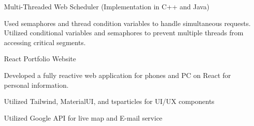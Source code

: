 \begin{cventries}
  \cventry
    {} %
    {Multi-Threaded Web Scheduler (Implementation in C++ and Java)} %
    {} %
    {} %
    {
    \vspace{-5ex}
      \begin{cvitems} %
        \item { Used semaphores and thread condition variables to handle simultaneous requests. Utilized conditional variables and semaphores to prevent multiple threads from accessing critical segments.}
      \end{cvitems}
    }
 
 
   \cventry
    {} %
    {React Portfolio Website} %
    {} %
    {} %
    {
    \vspace{-4ex}
      \begin{cvitems} %
        \item { Developed a fully reactive web application for phones and PC on React for personal information.}
        \item { Utilized Tailwind, MaterialUI, and tsparticles for UI/UX components }
        \item { Utilized Google API for live map and E-mail service }
      \end{cvitems}
    }
     \vspace{-3ex}


\end{cventries}